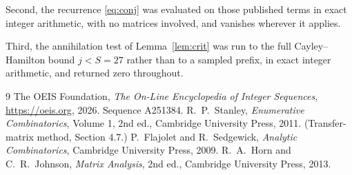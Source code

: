 \documentclass[11pt,a4paper]{article}
\theoremstyle{plain}
\theoremstyle{definition}
\begin{document}
Second, the recurrence \eqref{eq:conj} was evaluated on those published terms in exact
integer arithmetic, with no matrices involved, and vanishes wherever it applies.

Third, the annihilation test of Lemma~\ref{lem:crit} was run to the full Cayley--Hamilton
bound $j<S=27$ rather than to a sampled prefix, in exact integer arithmetic, and returned
zero throughout.

\begin{thebibliography}{9}
 The OEIS Foundation, \emph{The On-Line Encyclopedia of Integer
Sequences}, \url{https://oeis.org}, 2026. Sequence A251384.
 R.~P.~Stanley, \emph{Enumerative Combinatorics}, Volume 1, 2nd ed.,
Cambridge University Press, 2011. (Transfer-matrix method, Section 4.7.)
 P.~Flajolet and R.~Sedgewick, \emph{Analytic Combinatorics}, Cambridge
University Press, 2009.
 R.~A.~Horn and C.~R.~Johnson, \emph{Matrix Analysis}, 2nd ed., Cambridge
University Press, 2013.
\end{thebibliography}
\end{document}
